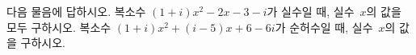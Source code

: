 다음 물음에 답하시오.
 복소수 $(1+i)x^2-2x-3-i$가 실수일 때, 실수~$x$의 값을 모두 구하시오.
 복소수 $(1+i)x^2+(i-5)x+6-6i$가 순허수일 때, 실수~$x$의 값을 구하시오.
